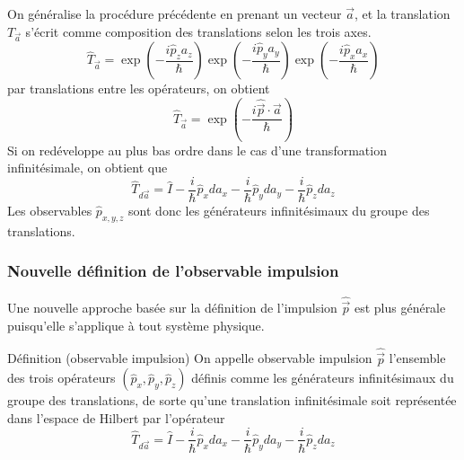     On généralise la procédure précédente en prenant un vecteur $\vec{a}$, et la translation $T_{\vec{a}}$ s’écrit comme composition des translations selon les trois axes.
    \[ \hat{T}_{\vec{a}} = \exp\left(-\frac{i \hat{p}_z a_z}{\hbar}\right)\exp\left(-\frac{i \hat{p}_y a_y}{\hbar}\right)\exp\left(-\frac{i \hat{p}_x a_x}{\hbar}\right) \]
    par translations entre les opérateurs, on obtient 
    \[ \hat{T}_{\vec{a}} = \exp\left(-\frac{i\hat{\vec{p}}\cdot \vec{a}}{\hbar}\right) \]   
    Si on redéveloppe au plus bas ordre dans le cas d’une transformation infinitésimale, on obtient que 
    \[ \hat{T}_{d\vec{a}} = \hat{I} - \frac{i}{\hbar} \hat{p}_x da_x - \frac{i}{\hbar} \hat{p}_y da_y - \frac{i}{\hbar} \hat{p}_z da_z \]   
    Les observables $\hat{p}_{x,y,z}$ sont donc les générateurs infinitésimaux du groupe des translations.

        \subsubsection{Nouvelle définition de l’observable impulsion}

    Une nouvelle approche basée sur la définition de l’impulsion $\hat{\vec{p}}$ est plus générale puisqu’elle s’applique à tout système physique.

    \begin{omed}{Définition (observable impulsion)}
        On appelle observable impulsion $\hat{\vec{p}}$ l’ensemble des trois opérateurs $(\hat{p}_x, \hat{p}_y, \hat{p}_z)$ définis comme les générateurs infinitésimaux du groupe des translations, de sorte qu’une translation infinitésimale soit représentée dans l’espace de Hilbert par l’opérateur 
        \[ \hat{T}_{d\vec{a}} = \hat{I} - \frac{i}{\hbar} \hat{p}_x da_x - \frac{i}{\hbar} \hat{p}_y da_y - \frac{i}{\hbar} \hat{p}_z da_z \]   
    \end{omed}

